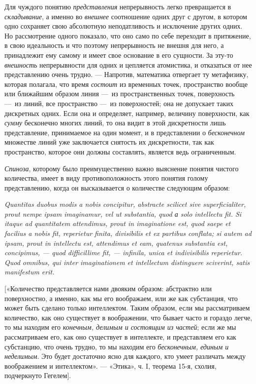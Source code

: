 Для чуждого понятию {\em представления} непрерывность
легко превращается в {\em складывание}, а именно во
{\em внешнее} соотношение одних друг с другом, в
котором одно сохраняет свою абсолютную неподатливость и исключение других
одних. Но рассмотрение одного показало, что оно само по себе переходит в
притяжение, в свою идеальность и что поэтому непрерывность не внешня для
него, а принадлежит ему самому и имеет свое основание в его сущности. За
эту-то {\em внешность} непрерывности для одних и
цепляется атомистика, и отказаться от нее представлению очень трудно. —
Напротив, математика отвергает ту метафизику, которая полагала, что время
{\em состоит} из временных точек, пространство вообще
или ближайшим образом линия —~из пространственных точек, поверхность —~из
линий, все пространство —~из поверхностей; она не допускает таких
дискретных одних. Если она и определяет, например, величину поверхности,
как {\em сумму} бесконечно многих линий, то она видит в
этой дискретности лишь представление, принимаемое на один момент, и в
представлении о {\em бесконечном} множестве линий уже
заключается снятость их дискретности, так как пространство, которое они
должны составлять, является ведь ограниченным.

{\em Спиноза}, которому было преимущественно важно
выяснение понятия чистого количества, имеет в виду противоположность этого
понятия голому представлению, когда он высказывается о количестве следующим
образом:

{\em Quantitas duobus modis a
nobis concipitur, abstracte scilicet sive superficialiter, prout nempe
ipsam imaginamur, vel ut substantia, quod а solo intellectu
fit. Si itaque ad quantitatem attendimus, prout in imaginatione est, quod
saepe et facilius a nobis fit, reperietur finita, divisibilis et ex
partibus conflata; si autem ad ipsam, prout in intellectu est, attendimus
et eam, quatenus substantia est, concipimus, — quod difficillime fit, —
infinila, unica et indivisibilis reperietur. Quod omnibus, qui inter
imaginationem et intellectum distinguere sciverint, satis manifestum
erit.}

[«Количество представляется нами двояким образом: абстрактно или
поверхностно, а именно, как мы его воображаем, или же как субстанция, что
может быть сделано только интеллектом. Таким образом, если мы рассматриваем
количество, как оно существует в воображении, что бывает часто и гораздо
легче, то мы находим его {\em конечным, делимым и
состоящим из частей}; если же мы рассматриваем его, как оно существует в
интеллекте, и представляем его как субстанцию, что очень трудно, то мы
находим его {\em бесконечным, единым и неделимым}. Это
будет достаточно ясно для каждого, кто умеет различать между воображением и
интеллектом». — «Этика», ч. I, теорема 15-я, схолия, подчеркнуто Гегелем].

